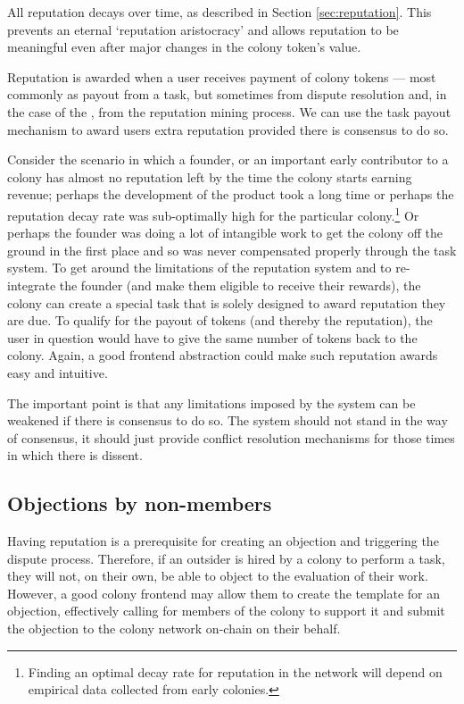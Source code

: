 All reputation decays over time, as described in Section \ref{sec:reputation}. This prevents an eternal `reputation aristocracy' and allows reputation to be meaningful even after major changes in the colony token's value.

Reputation is awarded when a user receives payment of colony tokens --- most commonly as payout from a task, but sometimes from dispute resolution and, in the case of the \rc, from the reputation mining process. We can use the task payout mechanism to award users extra reputation provided there is consensus to do so.

Consider the scenario in which a founder, or an important early contributor to a colony has almost no reputation left by the time the colony starts earning revenue; perhaps the development of the product took a long time or perhaps the reputation decay rate was sub-optimally high for the particular colony.\footnote{Finding an optimal decay rate for reputation in the network will depend on empirical data collected from early colonies.} Or perhaps the founder was doing a lot of intangible work to get the colony off the ground in the first place and so was never compensated properly through the task system. To get around the limitations of the reputation system and to re-integrate the founder (and make them eligible to receive their rewards), the colony can create a special task that is solely designed to award reputation they are due. To qualify for the payout of tokens (and thereby the reputation), the user in question would have to give the same number of tokens back to the colony. Again, a good frontend abstraction could make such reputation awards easy and intuitive.

The important point is that any limitations imposed by the system can be weakened if there is consensus to do so. The system should not stand in the way of consensus, it should just provide conflict resolution mechanisms for those times in which there is dissent.

\subsection{Objections by non-members}

Having reputation is a prerequisite for creating an objection and triggering the dispute process. Therefore, if an outsider is hired by a colony to perform a task, they will not, on their own, be able to object to the evaluation of their work. However, a good colony frontend may allow them to create the template for an objection, effectively calling for members of the colony to support it and submit the objection to the colony network on-chain on their behalf.

